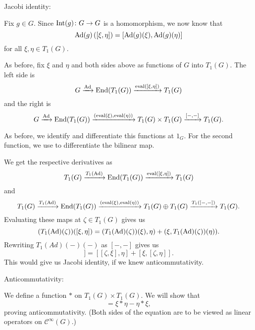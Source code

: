 \documentclass[12pt]{article}
\begin{document}
\begin{sketch}
	Jacobi identity: 

	Fix $g \in G$. Since $\operatorname{Int}(g) \colon G \to G$ is a homomorphism, we now know that
	\begin{equation*} 
		\operatorname{Ad}(g)\left([\xi, \eta]\right) = [\operatorname{Ad}(g)(\xi), \operatorname{Ad}(g)(\eta)]
	\end{equation*}
	for all $\xi, \eta \in T_{1}(G)$.

	As before, fix $\xi$ and $\eta$ and both sides above as functions of $G$ into $T_{1}(G)$. 
	The left side is
	\begin{equation*} 
		G \xrightarrow{\operatorname{Ad}} \operatorname{End}(T_{1}(G)) \xrightarrow{\operatorname{eval}([\xi, \eta])} T_{1}(G)
	\end{equation*}
	and the right is
	\begin{equation*} 
		G \xrightarrow{\operatorname{Ad}} \operatorname{End}(T_{1}(G)) \xrightarrow{(\operatorname{eval}(\xi), \operatorname{eval}(\eta))} T_{1}(G) \times T_{1}(G) \xrightarrow{[-, -]} T_{1}(G).
	\end{equation*}

	As before, we identify and differentiate this functions at $1_{G}$. 
	For the second function, we use  to differentiate the bilinear map.

	We get the respective derivatives as
	\begin{equation*} 
		T_{1}(G) \xrightarrow{T_{1}(\operatorname{Ad})} \operatorname{End}(T_{1}(G)) \xrightarrow{\operatorname{eval}([\xi, \eta])} T_{1}(G)
	\end{equation*}
	and
	\begin{equation*} 
		T_{1}(G) \xrightarrow{T_{1}(\operatorname{Ad})} \operatorname{End}(T_{1}(G)) \xrightarrow{(\operatorname{eval}(\xi), \operatorname{eval}(\eta))} T_{1}(G) \oplus T_{1}(G) \xrightarrow{T_{1}([-, -])} T_{1}(G).
	\end{equation*}
	Evaluating these maps at $\zeta \in T_{1}(G)$ gives us
	\begin{equation*} 
		(T_{1}(\operatorname{Ad})(\zeta))([\xi, \eta]) = (T_{1}(\operatorname{Ad})(\zeta))(\xi), \eta) + (\xi, T_{1}(\operatorname{Ad})(\zeta))(\eta)).
	\end{equation*}
	Rewriting $T_{1}(Ad)(-)(-)$ as $[-, -]$ gives us
	\begin{equation*} 
		[\zeta, [\xi, \eta]] = [[\zeta, \xi], \eta] + [\xi, [\zeta, \eta]].
	\end{equation*}
	This would give us Jacobi identity, if we knew anticommutativity.

	Anticommutativity: 

	We define a function $\ast$ on $T_{1}(G) \times T_{1}(G)$. 
	We will show that 
	\begin{equation*} 
		[\xi, \eta] = \xi \ast \eta - \eta \ast \xi,
	\end{equation*} 
	proving anticommutativity. 
	(Both sides of the equation are to be viewed as linear operators on $\mathcal{C}^{\infty}(G)$.)


\end{sketch}
\end{document}
